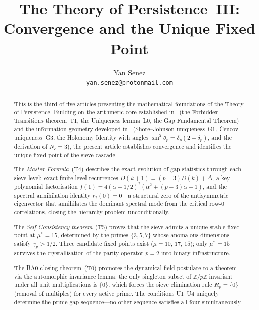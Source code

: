 \documentclass[12pt,a4paper]{article}
\title{\textbf{The Theory of Persistence~III:\\Convergence and the Unique Fixed Point}}
\author{Yan Senez\\\texttt{yan.senez@protonmail.com}}
\date{}
\begin{document}
\maketitle

\begin{abstract}
This is the third of five articles presenting the mathematical
foundations of the Theory of Persistence.  Building on the arithmetic
core established in~\cite{companion_M1} (the Forbidden Transitions
theorem~T1, the Uniqueness lemma~L0, the Gap Fundamental Theorem) and
the information geometry developed in~\cite{companion_M2}
(Shore--Johnson uniqueness~G1, \v{C}encov uniqueness~G3, the Holonomy
Identity with angles $\sin^2\!\theta_p = \delta_p(2 - \delta_p)$,
and the derivation of $N_c = 3$), the present article establishes
convergence and identifies the unique fixed point of the sieve cascade.

The \emph{Master Formula}~(T4) describes the exact evolution of gap
statistics through each sieve level: exact finite-level recurrences
$D(k{+}1) = (p{-}3)D(k) + \Delta$, a key polynomial factorisation
$f(1) = 4(\alpha - 1/2)^2(\alpha^2 + (p{-}3)\alpha + 1)$, and the
spectral annihilation identity $r_2(0) = 0$---a structural zero of
the antisymmetric eigenvector that annihilates the dominant spectral
mode from the critical row-0 correlations, closing the hierarchy
problem unconditionally.

The \emph{Self-Consistency theorem}~(T5) proves that the sieve admits
a unique stable fixed point at $\mu^* = 15$, determined by the primes
$\{3, 5, 7\}$ whose anomalous dimensions satisfy $\gamma_p > 1/2$.
Three candidate fixed points exist ($\mu = 10$, $17$, $15$); only
$\mu^* = 15$ survives the crystallisation of the parity operator
$p = 2$ into binary infrastructure.

The BA0 closing theorem~(T0) promotes the dynamical field postulate
to a theorem via the automorphic invariance lemma: the only singleton
subset of $\mathbb{Z}/p\mathbb{Z}$ invariant under all unit
multiplications is $\{0\}$, which forces the sieve elimination rule
$R_p = \{0\}$ (removal of multiples) for every active prime.  The
conditions U1--U4 uniquely determine the prime gap sequence---no other
sequence satisfies all four simultaneously.
\end{abstract}

\tableofcontents
\newpage

\end{document}
